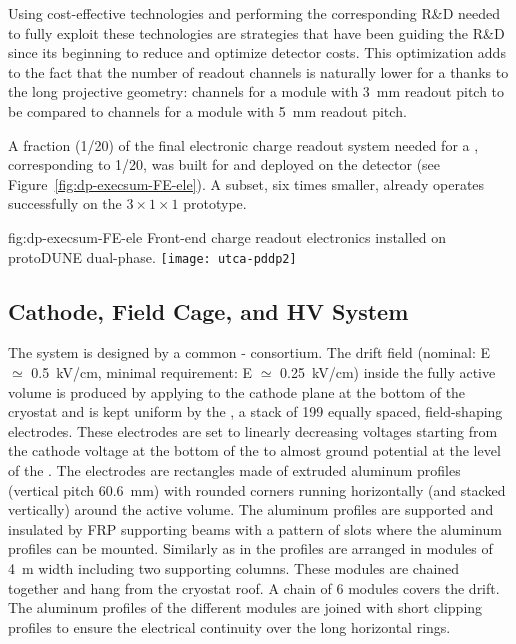Using cost-effective technologies and performing the corresponding R\&D needed to fully exploit these technologies are strategies that have been guiding the R\&D since its beginning to reduce and optimize detector costs.   
This optimization adds to the fact that the number of readout channels is naturally lower for a  thanks to the long projective geometry: \dpnumcrpch channels for a  module with \SI{3}{mm} readout pitch to be compared to \spnumch channels for a  module with \SI{5}{mm} readout pitch. 

A fraction (1/20) of the final electronic charge readout system needed for a   , corresponding to 1/20, was built for  and deployed on the detector (see Figure~\ref{fig:dp-execsum-FE-ele}).  A subset, six times smaller, already operates successfully  on the $3\times 1 \times 1$ prototype.

\begin{dunefigure}{fig:dp-execsum-FE-ele}
  {Front-end charge readout electronics installed on protoDUNE dual-phase.}
  \texttt{[image: utca-pddp2]}
\end{dunefigure}


\subsection{Cathode, Field Cage, and HV System}
\label{sec:dp-execsum-cathode}

The  system is designed by a common - consortium.
The drift field (nominal: E ${\simeq}$ \SI{0.5}{kV/cm}, minimal requirement: E ${\simeq}$ \SI{0.25}{kV/cm}) inside the fully active  volume is produced by applying  to the cathode plane at the bottom of the cryostat and is kept uniform by the , a stack of \num{199} equally spaced, field-shaping electrodes. %
These electrodes are set to linearly decreasing voltages starting from the cathode voltage at the bottom of the  to almost ground potential at the level of the . The electrodes are rectangles made of extruded aluminum profiles (vertical pitch \SI{60.6}{mm}) with rounded corners running horizontally (and stacked vertically) around the active volume. The aluminum profiles are supported and insulated by FRP supporting beams with a pattern of slots where the aluminum profiles can be mounted. Similarly as in  the profiles are arranged in modules of \SI{4}{m} width including two  supporting columns. These modules are chained together and  hang from the cryostat roof. A chain of \num{6} modules covers the \dpmaxdrift drift. The aluminum profiles of the different modules are joined with short clipping profiles to ensure the electrical continuity over the \dptpclen long horizontal rings. 

